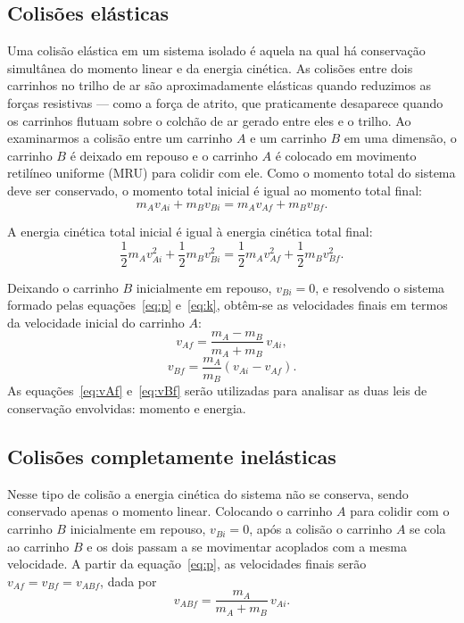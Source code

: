 \documentclass[12pt,a4paper]{article}
\begin{document}
\subsection{Colisões elásticas}
Uma colisão elástica em um sistema isolado é aquela na qual há conservação simultânea do momento
linear e da energia cinética. As colisões entre dois carrinhos no trilho de ar são
aproximadamente elásticas quando reduzimos as forças resistivas --- como a força de atrito, que
praticamente desaparece quando os carrinhos flutuam sobre o colchão de ar gerado entre eles e o
trilho. Ao examinarmos a colisão entre um carrinho $A$ e um carrinho $B$ em uma dimensão, o
carrinho $B$ é deixado em repouso e o carrinho $A$ é colocado em movimento retilíneo uniforme
(MRU) para colidir com ele. Como o momento total do sistema deve ser conservado, o momento total
inicial é igual ao momento total final:
\begin{equation}
\label{eq:p}
m_A v_{Ai} + m_B v_{Bi} = m_A v_{Af} + m_B v_{Bf}.
\end{equation}

A energia cinética total inicial é igual à energia cinética total final:
\begin{equation}
\label{eq:k}
\frac{1}{2}m_A v_{Ai}^2 + \frac{1}{2}m_B v_{Bi}^2 =
\frac{1}{2}m_A v_{Af}^2 + \frac{1}{2}m_B v_{Bf}^2.
\end{equation}

Deixando o carrinho $B$ inicialmente em repouso, $v_{Bi}=0$, e resolvendo o sistema formado pelas
equações~\eqref{eq:p} e~\eqref{eq:k}, obtêm-se as velocidades finais em termos da velocidade
inicial do carrinho $A$:
\begin{equation}
\label{eq:vAf}
v_{Af} = \frac{m_A - m_B}{m_A + m_B}\, v_{Ai},
\end{equation}
\begin{equation}
\label{eq:vBf}
v_{Bf} = \frac{m_A}{m_B}\left(v_{Ai} - v_{Af}\right).
\end{equation}
As equações~\eqref{eq:vAf} e~\eqref{eq:vBf} serão utilizadas para analisar as duas leis de
conservação envolvidas: momento e energia.

\subsection{Colisões completamente inelásticas}
Nesse tipo de colisão a energia cinética do sistema não se conserva, sendo conservado apenas o
momento linear. Colocando o carrinho $A$ para colidir com o carrinho $B$ inicialmente em repouso,
$v_{Bi}=0$, após a colisão o carrinho $A$ se cola ao carrinho $B$ e os dois passam a se
movimentar acoplados com a mesma velocidade. A partir da equação~\eqref{eq:p}, as velocidades
finais serão $v_{Af}=v_{Bf}=v_{ABf}$, dada por
\begin{equation}
\label{eq:vABf}
v_{ABf} = \frac{m_A}{m_A + m_B}\, v_{Ai}.
\end{equation}
\end{document}
